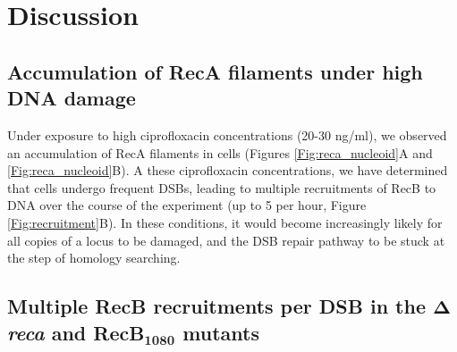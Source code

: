 \section*{Discussion}

\subsection*{Accumulation of RecA filaments under high DNA damage}
Under exposure to high ciprofloxacin concentrations (20-30 ng/ml), we observed an accumulation of RecA filaments in cells (Figures \ref{Fig:reca_nucleoid}A and \ref{Fig:reca_nucleoid}B). A these ciprofloxacin concentrations, we have determined that cells undergo frequent DSBs, leading to multiple recruitments of RecB to DNA over the course of the experiment (up to 5 per hour, Figure \ref{Fig:recruitment}B). In these conditions, it would become increasingly likely for all copies of a locus to be damaged, and the DSB repair pathway to be stuck at the step of homology searching.

\subsection*{Multiple RecB recruitments per DSB in the $\mathbf{\Delta}$\emph{reca} and RecB$\mathbf{_{1080}}$ mutants}

